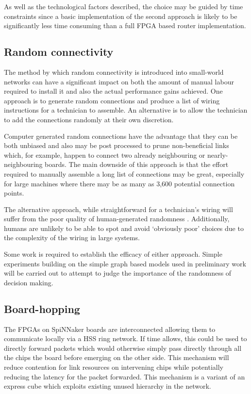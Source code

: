 			As well as the technological factors described, the choice may be guided
			by time constraints since a basic implementation of the second approach is
			likely to be significantly less time consuming than a full FPGA based
			router implementation.
		
		\subsection{Random connectivity}
			
			The method by which random connectivity is introduced into small-world
			networks can have a significant impact on both the amount of manual labour
			required to install it and also the actual performance gains achieved. One
			approach is to generate random connections and produce a list of wiring
			instructions for a technician to assemble. An alternative is to allow the
			technician to add the connections randomly at their own discretion.
			
			Computer generated random connections have the advantage that they can be
			both unbiased and also may be post processed to prune non-beneficial links
			which, for example, happen to connect two already neighbouring or
			nearly-neighbouring boards. The main downside of this approach is that the
			effort required to manually assemble a long list of connections may be
			great, especially for large machines where there may be as many as 3,600
			potential connection points.
			
			The alternative approach, while straightforward for a technician's wiring
			will suffer from the poor quality of human-generated randomness
			\cite{figurska08}. Additionally, humans are unlikely to be able to spot
			and avoid `obviously poor' choices due to the complexity of the wiring in
			large systems.
			
			Some work is required to establish the efficacy of either approach. Simple
			experiments building on the simple graph based models used in preliminary
			work will be carried out to attempt to judge the importance of the
			randomness of decision making.
		
		\subsection{Board-hopping}
			
			
			The FPGAs on SpiNNaker boards are interconnected allowing them to
			communicate locally via a HSS ring network. If time allows, this could be
			used to directly forward packets which would otherwise simply pass
			directly through all the chips the board before emerging on the other
			side. This mechanism will reduce contention for link resources on
			intervening chips while potentially reducing the latency for the packet
			forwarded. This mechanism is a variant of an express cube \cite{dally91}
			which exploits existing unused hierarchy in the network.
		
